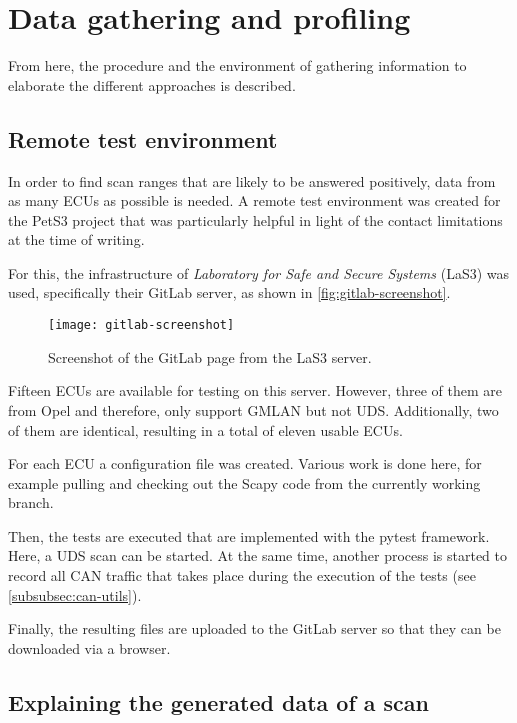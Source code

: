 \chapter{Data gathering and profiling}
\label{sec:data-gathering}

From here, the procedure and the environment of gathering information to elaborate the different approaches is described.

\section{Remote test environment}

In order to find scan ranges that are likely to be answered positively, data from as many ECUs as possible is needed. A remote test environment was created for the PetS3 project that was particularly helpful in light of the contact limitations at the time of writing.

For this, the infrastructure of \emph{Laboratory for Safe and Secure Systems} (LaS3) was used, specifically their GitLab server, as shown in \autoref{fig:gitlab-screenshot}.

\begin{figure}[htb]
    \centering
    \texttt{[image: gitlab-screenshot]}
    \caption{Screenshot of the GitLab page from the LaS3 server.}
    \label{fig:gitlab-screenshot}
\end{figure}

Fifteen ECUs are available for testing on this server. However, three of them are from Opel and therefore, only support GMLAN but not UDS. Additionally, two of them are identical, resulting in a total of eleven usable ECUs.

For each ECU a configuration file was created. Various work is done here, for example pulling and checking out the Scapy code from the currently working branch.

Then, the tests are executed that are implemented with the pytest framework. Here, a UDS scan can be started. At the same time, another process is started to record all CAN traffic that takes place during the execution of the tests (see \autoref{subsubsec:can-utils}).

Finally, the resulting files are uploaded to the GitLab server so that they can be downloaded via a browser.

\section{Explaining the generated data of a scan}

